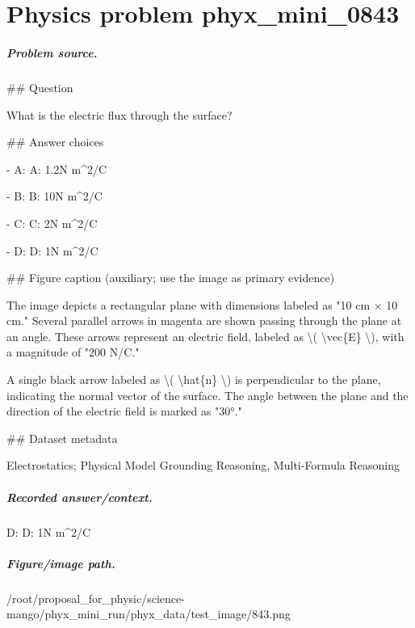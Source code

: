 
\chapter{Physics problem phyx\_mini\_0843}
\label{ch:PhyXMiniProblems_problem_phyx_mini_0843}

\paragraph{Problem source.}
\#\# Question

What is the electric flux through the surface?

\#\# Answer choices

- A: A: 1.2N m\textasciicircum{}2/C

- B: B: 10N m\textasciicircum{}2/C

- C: C: 2N m\textasciicircum{}2/C

- D: D: 1N m\textasciicircum{}2/C

\#\# Figure caption (auxiliary; use the image as primary evidence)

The image depicts a rectangular plane with dimensions labeled as "10 cm × 10 cm." Several parallel arrows in magenta are shown passing through the plane at an angle. These arrows represent an electric field, labeled as \textbackslash{}( \textbackslash{}vec\{E\} \textbackslash{}), with a magnitude of "200 N/C."

A single black arrow labeled as \textbackslash{}( \textbackslash{}hat\{n\} \textbackslash{}) is perpendicular to the plane, indicating the normal vector of the surface. The angle between the plane and the direction of the electric field is marked as "30°."

\#\# Dataset metadata

Electrostatics; Physical Model Grounding Reasoning, Multi-Formula Reasoning

\paragraph{Recorded answer/context.}
D: D: 1N m\textasciicircum{}2/C

\paragraph{Figure/image path.}
/root/proposal\_for\_physic/science-mango/phyx\_mini\_run/phyx\_data/test\_image/843.png

